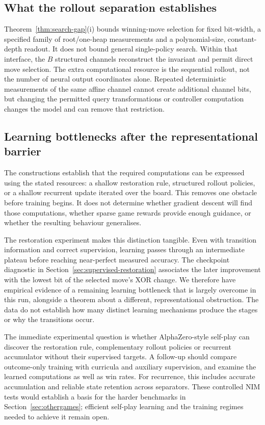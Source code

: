 \documentclass[twoside,11pt]{article}
\numberwithin{theorem}{section}
\numberwithin{equation}{section}
\begin{document}
\subsection{What the rollout separation establishes}
\label{sec:multipolicy-discussion}
Theorem~\ref{thm:search-gap}(i) bounds winning-move selection for fixed bit-width, a specified family of root/one-heap measurements and a polynomial-size, constant-depth readout. It does not bound general single-policy search. Within that interface, the $B$ structured channels reconstruct the invariant and permit direct move selection.
The extra computational resource is the sequential rollout, not the number of neural output coordinates alone. Repeated deterministic measurements of the same affine channel cannot create additional channel bits, but changing the permitted query transformations or controller computation changes the model and can remove that restriction.

\subsection{Learning bottlenecks after the representational barrier}
\label{sec:opt-gap}

The constructions establish that the required computations can be expressed using the stated resources: a shallow restoration rule, structured rollout policies, or a shallow recurrent update iterated over the board. This removes one obstacle before training begins. It does not determine whether gradient descent will find those computations, whether sparse game rewards provide enough guidance, or whether the resulting behaviour generalises.

The restoration experiment makes this distinction tangible. Even with transition information and correct supervision, learning passes through an intermediate plateau before reaching near-perfect measured accuracy. The checkpoint diagnostic in Section~\ref{sec:supervised-restoration} associates the later improvement with the lowest bit of the selected move's XOR change. We therefore have empirical evidence of a remaining learning bottleneck that is largely overcome in this run, alongside a theorem about a different, representational obstruction. The data do not establish how many distinct learning mechanisms produce the stages or why the transitions occur.

The immediate experimental question is whether AlphaZero-style self-play can discover the restoration rule, complementary rollout policies or recurrent accumulator without their supervised targets. A follow-up should compare outcome-only training with curricula and auxiliary supervision, and examine the learned computations as well as win rates. For recurrence, this includes accurate accumulation and reliable state retention across separators. These controlled NIM tests would establish a basis for the harder benchmarks in Section~\ref{sec:othergames}; efficient self-play learning and the training regimes needed to achieve it remain open.
\end{document}
